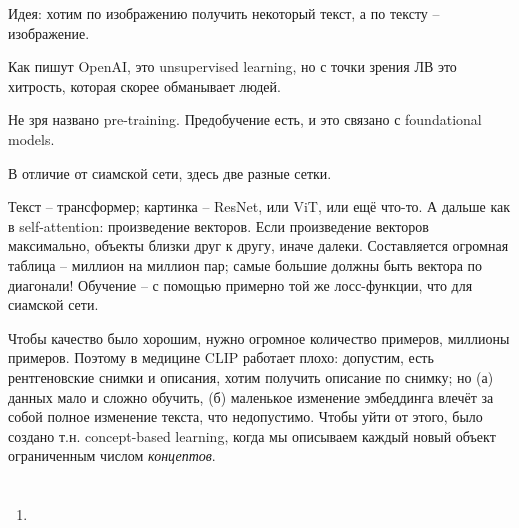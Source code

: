 \documentclass[a4paper,12pt]{article}
\begin{document}
Идея: хотим по изображению получить некоторый текст, а по тексту -- изображение.

Как пишут OpenAI, это unsupervised learning, но с точки зрения ЛВ это хитрость, которая скорее обманывает людей.

Не зря названо pre-training.
Предобучение есть, и это связано с foundational models.

В отличие от сиамской сети, здесь две разные сетки.

Текст -- трансформер; картинка -- ResNet, или ViT, или ещё что-то.
А дальше как в self-attention: произведение векторов.
Если произведение векторов максимально, объекты близки друг к другу, иначе далеки.
Составляется огромная таблица -- миллион на миллион пар; самые большие должны быть вектора по диагонали!
Обучение -- с помощью примерно той же лосс-функции, что для сиамской сети.

Чтобы качество было хорошим, нужно огромное количество примеров, миллионы примеров.
Поэтому в медицине CLIP работает плохо: допустим, есть рентгеновские снимки и описания, хотим получить описание по снимку; но (а) данных мало и сложно обучить, (б) маленькое изменение эмбеддинга влечёт за собой полное изменение текста, что недопустимо.
Чтобы уйти от этого, было создано т.н. concept-based learning, когда мы описываем каждый новый объект ограниченным числом \emph{концептов}.

\section{}
\subsection{}

\begin{enumerate}[noitemsep]
	\item 
\end{enumerate}
	
	
\end{document}
